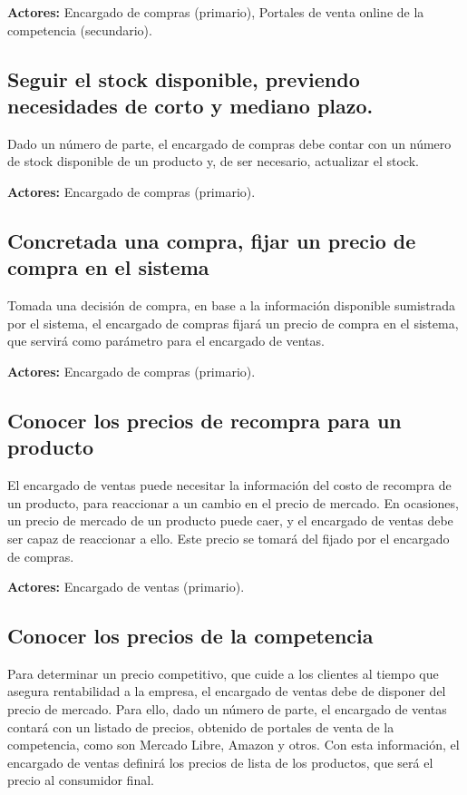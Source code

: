 \textbf{Actores:} Encargado de compras (primario), Portales de venta online de la competencia (secundario).

\subsection{Seguir el stock disponible, previendo necesidades de corto y mediano plazo.}

Dado un número de parte,
el encargado de compras debe contar con un número de stock disponible de un producto y,
de ser necesario,
actualizar el stock.

\textbf{Actores:} Encargado de compras (primario).

\subsection{Concretada una compra, fijar un precio de compra en el sistema}

Tomada una decisión de compra,
en base a la información disponible sumistrada por el sistema,
el encargado de compras fijará un precio de compra en el sistema,
que servirá como parámetro para el encargado de ventas.

\textbf{Actores:} Encargado de compras (primario).


\subsection{Conocer los precios de recompra para un producto}

El encargado de ventas puede necesitar la información del costo de recompra de un producto,
para reaccionar a un cambio en el precio de mercado.
En ocasiones, un precio de mercado de un producto puede caer,
y el encargado de ventas debe ser capaz de reaccionar a ello.
Este precio se tomará del fijado por el encargado de compras.

\textbf{Actores:} Encargado de ventas (primario).

\subsection{Conocer los precios de la competencia}

Para determinar un precio competitivo,
que cuide a los clientes al tiempo que asegura rentabilidad a la empresa,
el encargado de ventas debe de disponer del precio de mercado.
Para ello, 
dado un número de parte,
el encargado de ventas contará con un listado de precios,
obtenido de portales de venta de la competencia, 
como son Mercado Libre, Amazon y otros.
Con esta información, 
el encargado de ventas definirá los precios de lista de los productos,
que será el precio al consumidor final.

